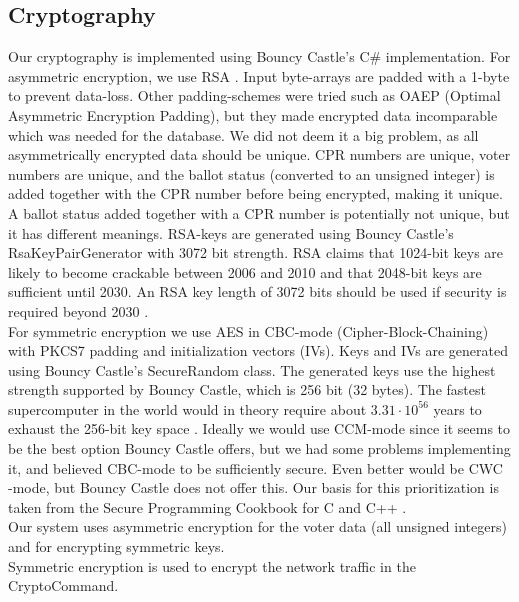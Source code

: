 \documentclass[a4paper]{report}
\begin{document}
\subsection{Cryptography}
\label{sec:crypto}
Our cryptography is implemented using Bouncy Castle's \cite{bouncy} C\# implementation. 
For asymmetric encryption, we use RSA \cite{rsa}. Input byte-arrays are padded with a 1-byte to prevent data-loss. Other padding-schemes were tried such as OAEP \cite{oaep} (Optimal Asymmetric Encryption Padding), but they made encrypted data incomparable which was needed for the database. We did not deem it a big problem, as all asymmetrically encrypted data should be unique. CPR numbers are unique, voter numbers are unique, and the ballot status (converted to an unsigned integer) is added together with the CPR number before being encrypted, making it unique. A ballot status added together with a CPR number is potentially not unique, but it has different meanings.
RSA-keys are generated using Bouncy Castle's RsaKeyPairGenerator with 3072 bit strength. RSA claims that 1024-bit keys are likely to become crackable between 2006 and 2010 and that 2048-bit keys are sufficient until 2030. An RSA key length of 3072 bits should be used if security is required beyond 2030 \cite{rsastr}. \\

For symmetric encryption we use AES \cite{aes} in CBC-mode \cite{cbc} (Cipher-Block-Chaining) with PKCS7 \cite{pkcs7} padding and initialization vectors (IVs). Keys and IVs are generated using Bouncy Castle's SecureRandom class. The generated keys use the highest strength supported by Bouncy Castle, which is 256 bit (32 bytes). The fastest supercomputer in the world would in theory require about $3.31\cdot10^{56}$ years to exhaust the 256-bit key space \cite{aesstr}.
Ideally we would use CCM-mode \cite{ccm} since it seems to be the best option Bouncy Castle offers, but we had some problems implementing it, and believed CBC-mode to be sufficiently secure. Even better would be CWC \cite{ccm}-mode, but Bouncy Castle does not offer this. Our basis for this prioritization is taken from the Secure Programming Cookbook for C and C++ \cite{ccm}. \\

Our system uses asymmetric encryption for the voter data (all unsigned integers) and for encrypting symmetric keys. \\

Symmetric encryption is used to encrypt the network traffic in the CryptoCommand. \\
\end{document}
